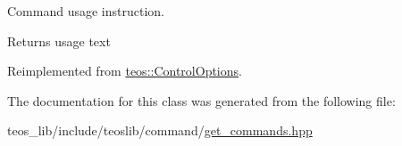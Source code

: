 Command \textquotesingle{}usage\textquotesingle{} instruction. 

\begin{DoxyReturn}{Returns}
usage text 
\end{DoxyReturn}


Reimplemented from \mbox{\hyperlink{classteos_1_1_control_options_a0aa5671f9bc750ed5280c26c543874f3}{teos\+::\+Control\+Options}}.



The documentation for this class was generated from the following file\+:\begin{DoxyCompactItemize}
\item 
teos\+\_\+lib/include/teoslib/command/\mbox{\hyperlink{get__commands_8hpp}{get\+\_\+commands.\+hpp}}\end{DoxyCompactItemize}
